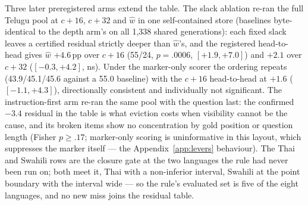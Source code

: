 \documentclass{article}
\begin{document}
Three later preregistered arms extend the table. The slack ablation
re-ran the full Telugu pool at $c{+}16$, $c{+}32$ and $\hat w$ in one
self-contained store (baselines byte-identical to the depth arm's on
all 1{,}338 shared generations): each fixed slack leaves a certified
residual strictly deeper than $\hat w$'s, and the registered
head-to-head gives $\hat w$ $+4.6$\,pp over $c{+}16$ (55/24,
$p{=}.0006$, $[+1.9,+7.0]$) and $+2.1$ over $c{+}32$ ($[-0.3,+4.2]$,
ns). Under the marker-only scorer the ordering repeats
(43.9/45.1/45.6 against a 55.0 baseline) with the $c{+}16$
head-to-head at $+1.6$ ($[-1.1,+4.3]$), directionally consistent and
individually not significant. The instruction-first arm re-ran the
same pool with the question last: the confirmed $-3.4$ residual in the
table is what eviction costs when visibility cannot be the cause, and
its broken items show no concentration by gold position or question
length (Fisher $p \ge .17$; marker-only scoring is uninformative in
this layout, which suppresses the marker itself --- the
Appendix~\ref{app:levers} behaviour). The Thai and Swahili rows are
the closure gate at the two languages the rule had never been run on;
both meet it, Thai with a non-inferior interval, Swahili at the point
boundary with the interval wide --- so the rule's evaluated set is
five of the eight languages, and no new miss joins the residual
table.
\end{document}
